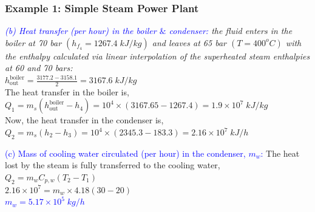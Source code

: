 \documentclass[10pt,compress]{beamer}
\begin{document}
\begin{frame}
 \frametitle{Example 1: Simple Steam Power Plant}
    {\it 
    \textcolor{blue}{(b) Heat transfer (per hour) in the boiler $\&$ condenser:} the fluid enters in the boiler at 70 bar $\left(h_{f_{4}}=1267.4\;kJ/kg\right)$ and leaves at 65 bar $\left(T=400^{o}C\right)$ with the enthalpy calculated via linear interpolation of the superheated steam enthalpies at 60 and 70 bars:}\\
\medskip
$h_{\text{out}}^{\text{boiler}}=\displaystyle\frac{3177.2-3158.1}{2}=3167.6\;kJ/kg$\\
The heat transfer in the boiler is, \\
$Q_{1}=m_{s}\left(h_{\text{out}}^{\text{boiler}}-h_{4}\right)=10^{4}\times\left(3167.65-1267.4\right)=1.9\times 10^{7}\;kJ/kg$
\\
\medskip
Now, the heat transfer in the condenser is,\\
\medskip
$Q_{2}=m_{s}\left(h_{2}-h_{3}\right)=10^{4}\times\left(2345.3-183.3\right)=2.16\times 10^{7}\; kJ/h$\\
\medskip

\textcolor{blue}{(c) Mass of cooling water circulated (per hour) in the condenser, $m_{w}$:} The heat lost by the steam is fully transferred to the cooling water,\\
\medskip 
$Q_{2}=m_{w}C_{p,w}\left(T_{2}-T_{1}\right)$\\
\medskip
$2.16\times 10^{7} = m_{w}\times 4.18\left(30-20\right)$\\
\medskip
\textcolor{blue}{$m_{w}=5.17\times 10^{5}\;kg/h$}


 \normalsize
\end{frame}
\end{document}
